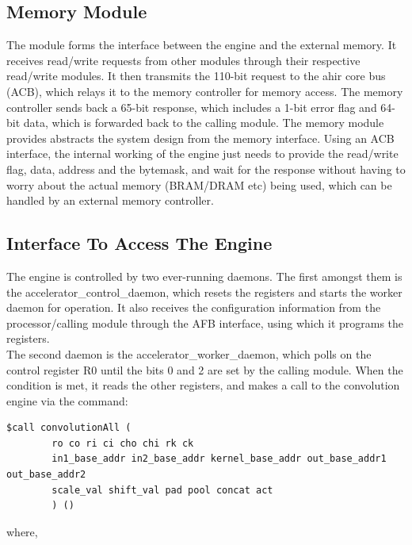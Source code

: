\documentclass[a4paper,12pt, final]{report}
\begin{document}
\subsection{Memory Module}

The module forms the interface between the engine and the external memory. It receives read/write requests from other modules through their respective read/write modules. It then transmits the 110-bit request to the ahir core bus (ACB), which relays it to the memory controller for memory access. The memory controller sends back a 65-bit response, which includes a 1-bit error flag and 64-bit data, which is forwarded back to the calling module. The memory module provides abstracts the system design from the memory interface. Using an ACB interface, the internal working of the engine just needs to provide the read/write flag, data, address and the bytemask, and wait for the response without having to worry about the actual memory (BRAM/DRAM etc) being used, which can be handled by an external memory controller.

\subsection{Interface To Access The Engine}

The engine is controlled by two ever-running daemons. The first amongst them is the accelerator\_control\_daemon, which resets the registers and starts the worker daemon for operation. It also receives the configuration information from the processor/calling module through the AFB interface, using which it programs the registers.
\\

The second daemon is the accelerator\_worker\_daemon, which polls on the control register R0 until the bits 0 and 2 are set by the calling module. When the condition is met, it reads the other registers, and makes a call to the convolution engine via the command:
\\

\begin{Verbatim}
$call convolutionAll (
		ro co ri ci cho chi rk ck
		in1_base_addr in2_base_addr kernel_base_addr out_base_addr1 out_base_addr2
		scale_val shift_val pad pool concat act
		) ()
\end{Verbatim}
where,
\end{document}
